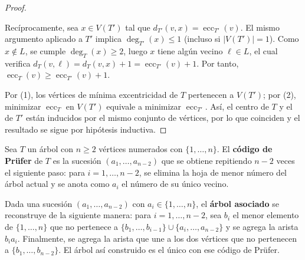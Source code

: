 \begin{proof}
\begin{enumerate}
              Recíprocamente, sea \( x \in V(T') \) tal que \( d_{T'}(v,x) = \operatorname{ecc}_{T'}(v) \). El mismo argumento aplicado a \( T' \) implica \( \deg_{T'}(x) \leq 1 \) (incluso si \( |V(T')| = 1 \)). Como \( x \notin L \), se cumple \( \deg_T(x) \geq 2 \), luego \( x \) tiene algún vecino \( \ell \in L \), el cual verifica \( d_T(v,\ell) = d_T(v,x) + 1 = \operatorname{ecc}_{T'}(v) + 1 \). Por tanto, \( \operatorname{ecc}_T(v) \geq \operatorname{ecc}_{T'}(v) + 1 \).
    \end{enumerate}

    Por (1), los vértices de mínima excentricidad de \( T \) pertenecen a \( V(T') \); por (2), minimizar \( \operatorname{ecc}_T \) en \( V(T') \) equivale a minimizar \( \operatorname{ecc}_{T'} \). Así, el centro de \( T \) y el de \( T' \) están inducidos por el mismo conjunto de vértices, por lo que coinciden y el resultado se sigue por hipótesis inductiva.
\end{proof}

\vspace{0.5cm}

\begin{definition}\label{def:prufer}
    Sea \( T \) un árbol con \( n \geq 2 \) vértices numerados con \( \{1, \ldots, n\} \). El \textbf{código de Prüfer} de \( T \) es la sucesión \( (a_1, \ldots, a_{n-2}) \) que se obtiene repitiendo \( n - 2 \) veces el siguiente paso: para \( i = 1, \ldots, n-2 \), se elimina la hoja de menor número del árbol actual y se anota como \( a_i \) el número de su único vecino.
\end{definition}

\begin{definition}\label{def:prufer-inverso}
    Dada una sucesión \( (a_1, \ldots, a_{n-2}) \) con \( a_i \in \{1, \ldots, n\} \), el \textbf{árbol asociado} se reconstruye de la siguiente manera: para \( i = 1, \ldots, n-2 \), sea \( b_i \) el menor elemento de \( \{1, \ldots, n\} \) que no pertenece a \( \{b_1, \ldots, b_{i-1}\} \cup \{a_i, \ldots, a_{n-2}\} \) y se agrega la arista \( b_i a_i \). Finalmente, se agrega la arista que une a los dos vértices que no pertenecen a \( \{b_1, \ldots, b_{n-2}\} \). El árbol así construido es el único con ese código de Prüfer.
\end{definition}

